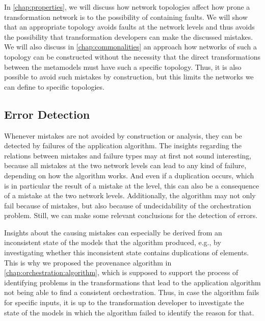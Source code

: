 
In \autoref{chap:properties}, we will discuss how network topologies affect how prone a transformation network is to the possibility of containing faults.
We will show that an appropriate topology avoids faults at the network levels and thus avoids the possibility that transformation developers can make the discussed mistakes.
We will also discuss in \autoref{chap:commonalities} an approach how networks of such a topology can be constructed without the necessity that the direct transformations between the metamodels must have such a specific topology.
Thus, it is also possible to avoid such mistakes by construction, but this limits the networks we can define to specific topologies.



\subsection{Error Detection}

Whenever mistakes are not avoided by construction or analysis, they can be detected by failures of the application algorithm.
The insights regarding the relations between mistakes and failure types may at first not sound interesting, because all mistakes at the two network levels can lead to any kind of failure, depending on how the algorithm works.
And even if a duplication occurs, which is in particular the result of a mistake at the \leveltransformation level, this can also be a consequence of a mistake at the two network levels.
Additionally, the algorithm may not only fail because of mistakes, but also because of undecidability of the orchestration problem.
Still, we can make some relevant conclusions for the detection of errors.

Insights about the causing mistakes can especially be derived from an inconsistent state of the models that the algorithm produced, e.g., by investigating whether this inconsistent state contains duplications of elements.
This is why we proposed the provenance algorithm in \autoref{chap:orchestration:algorithm}, which is supposed to support the process of identifying problems in the transformations that lead to the application algorithm not being able to find a consistent orchestration.
Thus, in case the algorithm fails for specific inputs, it is up to the transformation developer to investigate the state of the models in which the algorithm failed to identify the reason for that.

